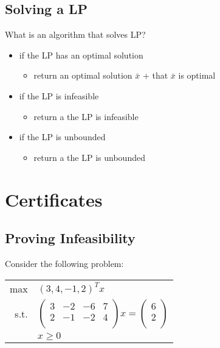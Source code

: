 \documentclass[letterpaper, 12pt]{article}
\newcommand{\red}[1]{{\color{red}{#1}}}
\begin{document}
    \subsection{Solving a LP}
    What is an algorithm that solves LP?
    \begin{itemize}
        \item if the LP has an optimal solution
        \begin{itemize}
            \item return an optimal solution $\bar{x}$ + \red{proof} that $\bar{x}$ is optimal
        \end{itemize}
        \item if the LP is infeasible
        \begin{itemize}
            \item return a \red{proof} the LP is infeasible
        \end{itemize}
        \item if the LP is unbounded
        \begin{itemize}
            \item return a \red{proof} the LP is unbounded
        \end{itemize}
    \end{itemize}
    
    \pagebreak
    \section{Certificates}
    \subsection{Proving Infeasibility}
    Consider the following problem:\\
    \begin{center}
        \begin{tabular}{rl}
            max & $(3,4,-1,2)^Tx$\\
            s.t. & $\begin{pmatrix}
                3 & -2 & -6 & 7\\
                2 & -1 & -2 & 4\\
            \end{pmatrix} x = \begin{pmatrix}
                6\\
                2\\
            \end{pmatrix}$\\
            & $x \geq 0$\\
        \end{tabular} 
    \end{center}
\end{document}

